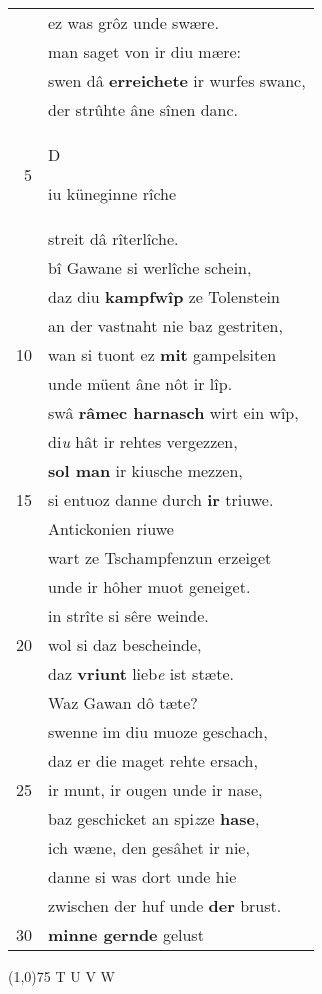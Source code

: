 \documentclass[8pt,a4paper,notitlepage]{article}
\begin{document}
\begin{table}[ht]
\begin{minipage}[t]{0.5\linewidth}
\begin{tabular}{rl}
 & ez was grôz unde swære.\\ 
 & man saget von ir diu mære:\\ 
 & swen dâ \textbf{erreichete} ir wurfes swanc,\\ 
 & der strûhte âne sînen danc.\\ 
5 & \begin{large}D\end{large}iu küneginne rîche\\ 
 & streit dâ rîterlîche.\\ 
 & bî Gawane si werlîche schein,\\ 
 & daz diu \textbf{kampfwîp} ze Tolenstein\\ 
 & an der vastnaht nie baz gestriten,\\ 
10 & wan si tuont ez \textbf{mit} gampelsiten\\ 
 & unde müent âne nôt ir lîp.\\ 
 & swâ \textbf{râmec harnasch} wirt ein wîp,\\ 
 & di\textit{u} hât ir rehtes vergezzen,\\ 
 & \textbf{sol man} ir kiusche mezzen,\\ 
15 & si entuoz danne durch \textbf{ir} triuwe.\\ 
 & Antickonien riuwe\\ 
 & wart ze Tschampfenzun erzeiget\\ 
 & unde ir hôher muot geneiget.\\ 
 & in strîte si sêre weinde.\\ 
20 & wol si daz bescheinde,\\ 
 & daz \textbf{vriunt} lieb\textit{e} ist stæte.\\ 
 & Waz Gawan dô tæte?\\ 
 & swenne im diu muoze geschach,\\ 
 & daz er die maget rehte ersach,\\ 
25 & ir munt, ir ougen unde ir nase,\\ 
 & baz geschicket an spi\textit{z}ze \textbf{hase},\\ 
 & ich wæne, den gesâhet ir nie,\\ 
 & danne si was dort unde hie\\ 
 & zwischen der huf unde \textbf{der} brust.\\ 
30 & \textbf{minne gernde} gelust\\ 
\end{tabular}
\scriptsize
\line(1,0){75} \newline
T U V W \newline

\end{minipage}
\end{table}
\end{document}

